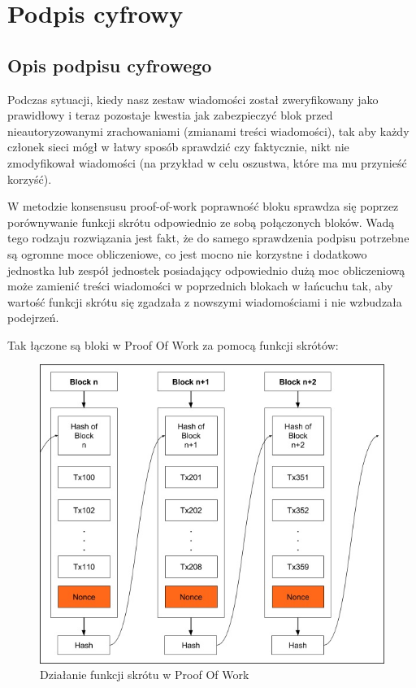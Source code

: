 \section{Podpis cyfrowy}
\subsection{Opis podpisu cyfrowego}
Podczas sytuacji, kiedy nasz zestaw wiadomości został zweryfikowany jako prawidłowy i teraz pozostaje kwestia jak zabezpieczyć blok przed nieautoryzowanymi zrachowaniami (zmianami treści wiadomości), tak aby każdy członek sieci mógł w łatwy sposób sprawdzić czy faktycznie, nikt nie zmodyfikował wiadomości (na przykład w celu oszustwa, które ma mu przynieść korzyść).

\vspace{1em}

W metodzie konsensusu proof-of-work poprawność bloku sprawdza się poprzez porównywanie funkcji skrótu odpowiednio ze sobą połączonych bloków. Wadą tego rodzaju rozwiązania jest fakt, że do samego sprawdzenia podpisu potrzebne są ogromne moce obliczeniowe, co jest mocno nie korzystne i dodatkowo jednostka lub zespół jednostek posiadający odpowiednio dużą moc obliczeniową może zamienić treści wiadomości w poprzednich blokach w łańcuchu tak, aby wartość funkcji skrótu się zgadzała z nowszymi wiadomościami i nie wzbudzała podejrzeń.

\vspace{1em}

Tak łączone są bloki w Proof Of Work za pomocą funkcji skrótów:
\begin{figure}[H]
    \centering
    \includegraphics[width=\textwidth]{Images/ProofOfWorkHash.jpg}
    \caption{Działanie funkcji skrótu w Proof Of Work}
    \label{fig:ProofOfWorkHash}
\end{figure}

